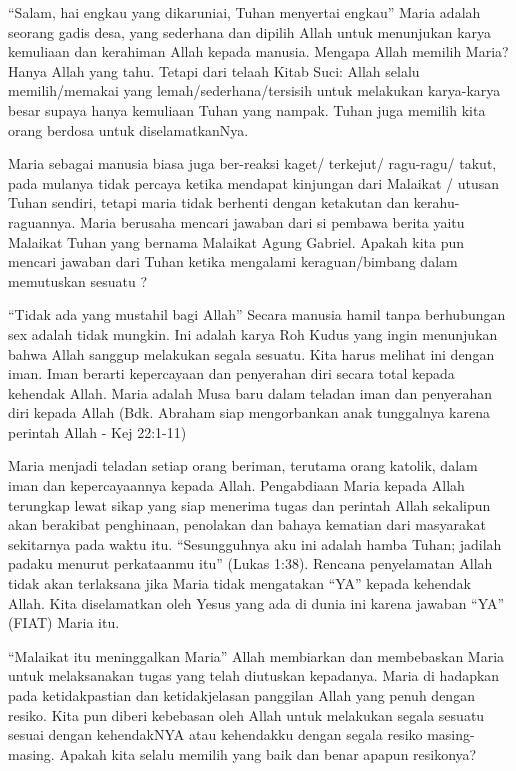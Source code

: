 
“Salam, hai engkau yang dikaruniai, Tuhan menyertai engkau”  Maria adalah seorang gadis desa, yang sederhana dan dipilih Allah untuk menunjukan karya kemuliaan dan kerahiman Allah kepada manusia. Mengapa Allah memilih Maria? Hanya Allah yang tahu. Tetapi dari telaah Kitab Suci: Allah selalu memilih/memakai yang lemah/sederhana/tersisih untuk melakukan karya-karya besar supaya hanya kemuliaan Tuhan yang nampak. Tuhan juga memilih kita orang berdosa untuk diselamatkanNya.


Maria sebagai manusia biasa juga ber-reaksi kaget/ terkejut/ ragu-ragu/ takut, pada mulanya tidak percaya ketika mendapat kinjungan dari Malaikat / utusan Tuhan sendiri, tetapi maria tidak berhenti dengan ketakutan dan kerahu-raguannya. Maria berusaha mencari jawaban dari si pembawa berita yaitu Malaikat Tuhan yang bernama Malaikat Agung Gabriel. Apakah kita pun mencari jawaban dari Tuhan ketika mengalami keraguan/bimbang dalam memutuskan sesuatu ?

“Tidak ada yang mustahil bagi Allah”  Secara manusia hamil tanpa berhubungan sex adalah tidak mungkin. Ini adalah karya Roh Kudus yang ingin menunjukan bahwa Allah sanggup melakukan segala sesuatu. Kita harus melihat ini dengan iman. Iman berarti kepercayaan dan penyerahan diri secara total kepada kehendak Allah. Maria adalah Musa baru dalam teladan iman dan penyerahan diri kepada Allah (Bdk. Abraham siap mengorbankan anak tunggalnya karena perintah Allah - Kej 22:1-11)

Maria menjadi teladan setiap orang beriman, terutama orang katolik, dalam iman dan kepercayaannya kepada Allah. Pengabdiaan Maria kepada Allah terungkap lewat sikap yang siap menerima tugas dan perintah Allah sekalipun akan berakibat penghinaan, penolakan dan bahaya kematian dari masyarakat sekitarnya pada waktu itu. “Sesungguhnya aku ini adalah hamba Tuhan; jadilah padaku menurut perkataanmu itu” (Lukas 1:38). Rencana penyelamatan Allah tidak akan terlaksana jika Maria tidak mengatakan “YA” kepada kehendak Allah. Kita diselamatkan oleh Yesus yang ada di dunia ini karena jawaban “YA” (FIAT) Maria itu.

“Malaikat itu meninggalkan Maria”  Allah membiarkan dan membebaskan Maria untuk melaksanakan tugas yang telah diutuskan kepadanya. Maria di hadapkan pada ketidakpastian dan ketidakjelasan panggilan Allah yang penuh dengan resiko. Kita pun diberi kebebasan oleh Allah untuk melakukan segala sesuatu sesuai dengan kehendakNYA atau kehendakku dengan segala resiko masing-masing. Apakah kita selalu memilih yang baik dan benar apapun resikonya?

